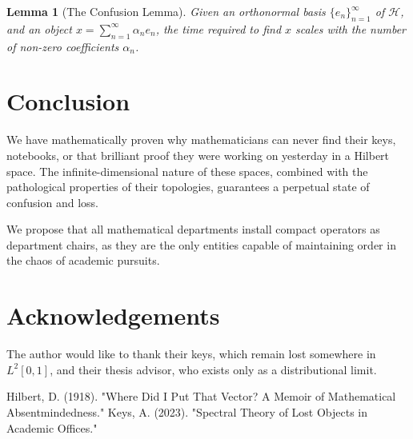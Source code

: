 \documentclass{article}
\newtheorem{lemma}[theorem]{Lemma}
\begin{document}
\begin{lemma}[The Confusion Lemma]
    Given an orthonormal basis $\{e_n\}_{n=1}^{\infty}$ of $\mathcal{H}$, and an object $x = \sum_{n=1}^{\infty} \alpha_n e_n$, the time required to find $x$ scales with the number of non-zero coefficients $\alpha_n$.
\end{lemma}

\section{Conclusion}

We have mathematically proven why mathematicians can never find their keys, notebooks, or that brilliant proof they were working on yesterday in a Hilbert space. The infinite-dimensional nature of these spaces, combined with the pathological properties of their topologies, guarantees a perpetual state of confusion and loss.

We propose that all mathematical departments install compact operators as department chairs, as they are the only entities capable of maintaining order in the chaos of academic pursuits.

\section*{Acknowledgements}

The author would like to thank their keys, which remain lost somewhere in $L^2[0,1]$, and their thesis advisor, who exists only as a distributional limit.

\begin{thebibliography}{9}
     Hilbert, D. (1918). "Where Did I Put That Vector? A Memoir of Mathematical Absentmindedness."
     Keys, A. (2023). "Spectral Theory of Lost Objects in Academic Offices."
\end{thebibliography}
\end{document}
